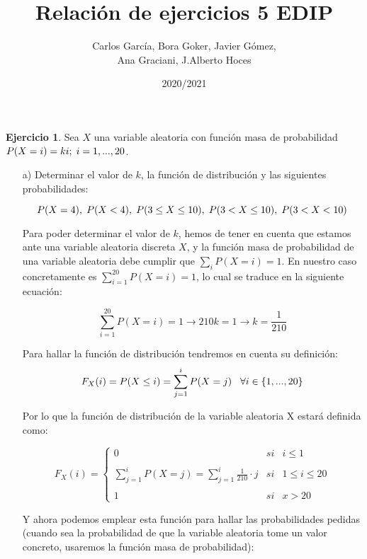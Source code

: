 \documentclass[a4paper, 12pt]{article}
\title{\textbf{Relación de ejercicios 5 EDIP}}
\author{Carlos García, Bora Goker, Javier Gómez,  \\ Ana Graciani, J.Alberto Hoces}
\date{2020/2021}
\theoremstyle{definition}
\newtheorem{ej}{Ejercicio}
\begin{document}
\maketitle

\begin{ej}
Sea $X$ una variable aleatoria con función masa de probabilidad $P(X=i)= ki; \hspace{0.1cm} i = 1, . . . , 20$.

\begin{enumerate}
    \item[a)] Determinar el valor de $k$, la función de distribución y las siguientes probabilidades:
    
    \[
    P (X = 4), \hspace{0.1cm} P (X < 4), \hspace{0.1cm} P (3 \leq X \leq 10), \hspace{0.1cm} P (3 < X \leq 10), \hspace{0.1cm} P (3 < X < 10)
    \]
    
    Para poder determinar el valor de $k$, hemos de tener en cuenta que estamos ante una variable aleatoria discreta $X$, y la función masa de probabilidad de una variable aleatoria debe cumplir que $\sum_{i} P(X=i)=1$. En nuestro caso concretamente es $\sum_{i=1}^{20} P(X=i)=1$, lo cual se traduce en la siguiente ecuación: 
    
    \[
        \sum_{i=1}^{20} P(X=i)=1 \rightarrow 210k = 1 \rightarrow k = \frac{1}{210}
    \]
    
    Para hallar la función de distribución tendremos en cuenta su definición: 
    \[
    F_{X}(i) = P(X \leq i) = \sum_{j=1}^{i} P(X=j) \hspace{0.3cm} \forall i \in \{1,...,20\}
    \]
    
    Por lo que la función de distribución de la variable aleatoria X estará definida como:
    
    \[
    F_{X}(i)= \left\{ \begin{array}{lcc}
             0 &   si  & i \leq 1 \\
             \\ \sum_{j=1}^{i} P(X=j) = \sum_{j=1}^{i} \frac{1}{210} \cdot j &  si & 1 \leq i \leq 20 \\
             \\ 1 &  si  & x > 20
             \end{array}
   \right.
    \]
    
    Y ahora podemos emplear esta función para hallar las probabilidades pedidas (cuando sea la probabilidad de que la variable aleatoria tome un valor concreto, usaremos la función masa de probabilidad):
    

\end{enumerate}
\end{ej}
\end{document}
